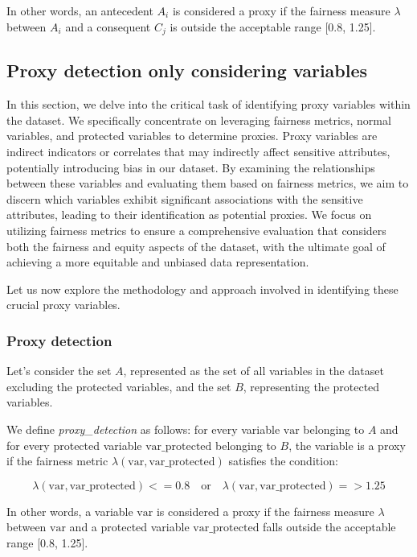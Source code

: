 \documentclass[12pt,a4paper,openright,twoside]{book}
\begin{document}
In other words, an antecedent \( A_i \) is considered a proxy if the fairness measure \( \lambda \) between \( A_i \) and a consequent \( C_j \) is outside the acceptable range [0.8, 1.25].

\subsection{Proxy detection only considering variables}
In this section, we delve into the critical task of identifying proxy variables within the dataset. We specifically concentrate on leveraging fairness metrics, normal variables, and protected variables to determine proxies. Proxy variables are indirect indicators or correlates that may indirectly affect sensitive attributes, potentially introducing bias in our dataset. By examining the relationships between these variables and evaluating them based on fairness metrics, we aim to discern which variables exhibit significant associations with the sensitive attributes, leading to their identification as potential proxies. We focus on utilizing fairness metrics to ensure a comprehensive evaluation that considers both the fairness and equity aspects of the dataset, with the ultimate goal of achieving a more equitable and unbiased data representation.

Let us now explore the methodology and approach involved in identifying these crucial proxy variables.

\subsubsection{Proxy detection}
Let's consider the set \( A \), represented as the set of all variables in the dataset excluding the protected variables, and the set \( B \), representing the protected variables.

We define \textit{proxy\_detection} as follows: for every variable \( \text{var} \) belonging to \( A \) and for every protected variable \( \text{var\_protected} \) belonging to \( B \), the variable is a proxy if the fairness metric \( \lambda(\text{var}, \text{var\_protected}) \) satisfies the condition:

\[
\lambda(\text{var}, \text{var\_protected}) <= 0.8 \quad \text{or} \quad \lambda(\text{var}, \text{var\_protected}) => 1.25
\]

In other words, a variable \( \text{var} \) is considered a proxy if the fairness measure \( \lambda \) between \( \text{var} \) and a protected variable \( \text{var\_protected} \) falls outside the acceptable range [0.8, 1.25].
\end{document}
